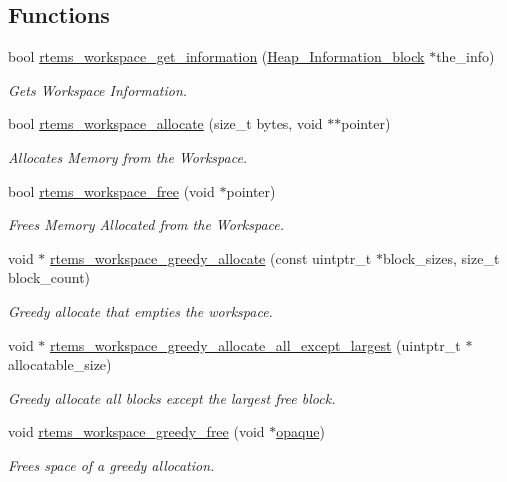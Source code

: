 \subsection*{Functions}
\begin{DoxyCompactItemize}
\item 
bool \mbox{\hyperlink{group__ClassicRTEMSWorkspace_ga95815bb0f8f80d806ffafe7fa47ab5c7}{rtems\+\_\+workspace\+\_\+get\+\_\+information}} (\mbox{\hyperlink{structHeap__Information__block}{Heap\+\_\+\+Information\+\_\+block}} $\ast$the\+\_\+info)
\begin{DoxyCompactList}\small\item\em Gets Workspace Information. \end{DoxyCompactList}\item 
bool \mbox{\hyperlink{group__ClassicRTEMSWorkspace_ga64ef053b5f7b0b526c024b2596a24dfb}{rtems\+\_\+workspace\+\_\+allocate}} (size\+\_\+t bytes, void $\ast$$\ast$pointer)
\begin{DoxyCompactList}\small\item\em Allocates Memory from the Workspace. \end{DoxyCompactList}\item 
bool \mbox{\hyperlink{group__ClassicRTEMSWorkspace_ga81fe88352cd9de960f78a48aa6d33f48}{rtems\+\_\+workspace\+\_\+free}} (void $\ast$pointer)
\begin{DoxyCompactList}\small\item\em Frees Memory Allocated from the Workspace. \end{DoxyCompactList}\item 
void $\ast$ \mbox{\hyperlink{group__ClassicRTEMSWorkspace_gac04da5a16a78a69df042a654558aca2b}{rtems\+\_\+workspace\+\_\+greedy\+\_\+allocate}} (const uintptr\+\_\+t $\ast$block\+\_\+sizes, size\+\_\+t block\+\_\+count)
\begin{DoxyCompactList}\small\item\em Greedy allocate that empties the workspace. \end{DoxyCompactList}\item 
void $\ast$ \mbox{\hyperlink{group__ClassicRTEMSWorkspace_ga631bbb4b9c5dab3b7da64412e1a19c16}{rtems\+\_\+workspace\+\_\+greedy\+\_\+allocate\+\_\+all\+\_\+except\+\_\+largest}} (uintptr\+\_\+t $\ast$allocatable\+\_\+size)
\begin{DoxyCompactList}\small\item\em Greedy allocate all blocks except the largest free block. \end{DoxyCompactList}\item 
void \mbox{\hyperlink{group__ClassicRTEMSWorkspace_gaaf063f7071bd9b97fca4fabfe7cd1166}{rtems\+\_\+workspace\+\_\+greedy\+\_\+free}} (void $\ast$\mbox{\hyperlink{structopaque}{opaque}})
\begin{DoxyCompactList}\small\item\em Frees space of a greedy allocation. \end{DoxyCompactList}\end{DoxyCompactItemize}


